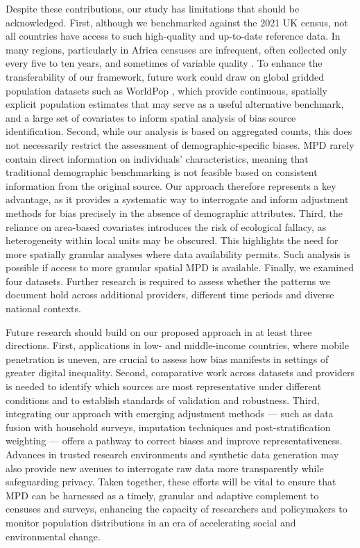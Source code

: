 \documentclass[]{rsos}%
\begin{document}
Despite these contributions, our study has limitations that should be
acknowledged. First, although we benchmarked against the 2021 UK census,
not all countries have access to such high-quality and up-to-date
reference data. In many regions, particularly in Africa censuses are
infrequent, often collected only every five to ten years, and sometimes
of variable quality \citep{dindi2025}. To enhance the transferability of our
framework, future work could draw on global gridded population datasets
such as WorldPop \citep{tatem2017}, which provide continuous, spatially
explicit population estimates that may serve as a useful alternative
benchmark, and a large set of covariates to inform spatial analysis of
bias source identification. Second, while our analysis is based on
aggregated counts, this does not necessarily restrict the assessment of
demographic-specific biases. MPD rarely contain direct information on
individuals' characteristics, meaning that traditional demographic
benchmarking is not feasible based on consistent information from the
original source. Our approach therefore represents a key advantage, as
it provides a systematic way to interrogate and inform adjustment
methods for bias precisely in the absence of demographic attributes.
Third, the reliance on area-based covariates introduces the risk of
ecological fallacy, as heterogeneity within local units may be obscured.
This highlights the need for more spatially granular analyses where data
availability permits. Such analysis is possible if access to more
granular spatial MPD is available. Finally, we examined four datasets.
Further research is required to assess whether the patterns we document
hold across additional providers, different time periods and diverse
national contexts.

Future research should build on our proposed approach in at least three
directions. First, applications in low- and middle-income countries,
where mobile penetration is uneven, are crucial to assess how bias
manifests in settings of greater digital inequality. Second, comparative
work across datasets and providers is needed to identify which sources
are most representative under different conditions and to establish
standards of validation and robustness. Third, integrating our approach
with emerging adjustment methods --- such as data fusion with household
surveys, imputation techniques and post-stratification weighting ---
offers a pathway to correct biases and improve representativeness.
Advances in trusted research environments and synthetic data generation
may also provide new avenues to interrogate raw data more transparently
while safeguarding privacy. Taken together, these efforts will be vital
to ensure that MPD can be harnessed as a timely, granular and adaptive
complement to censuses and surveys, enhancing the capacity of
researchers and policymakers to monitor population distributions in an
era of accelerating social and environmental change.
\end{document}
